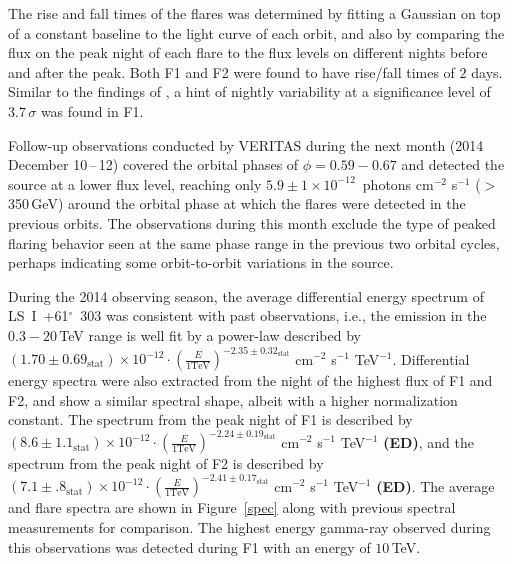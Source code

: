 \documentclass[preprint2]{aastex}
\newcommand{\tapp}{\raisebox{0.5ex}{\texttildelow}}
\newcommand{\pflux}{~photons cm$^{-2}$ s$^{-1}$}
\newcommand{\lsi}{LS~I~+61$^{\circ}$~303}
\newcommand{\gev}{\,GeV}
\newcommand{\tev}{\,TeV}
\begin{document}
The rise and fall times of the flares was determined by fitting a Gaussian on top of a constant baseline to the light curve of each orbit, and also by comparing the flux on the peak night of each flare to the flux levels on different nights before and after the peak. Both F1 and F2 were found to have rise/fall times of \tapp{}$2$ days. Similar to the findings of \cite{2013ApJ...779...88A}, a hint of nightly variability at a significance level of \tapp{}$3.7\,\sigma$ was found in F1.

Follow-up observations conducted by VERITAS during the next month (2014 December 10\,--\,12) covered the orbital phases of $\phi=0.59-0.67$ and detected the source at a lower flux level, reaching only $5.9 \pm 1 \times10^{-12}$\pflux{} ($>$350\gev{}) around the orbital phase at which the flares were detected in the previous orbits. The observations during this month exclude the type of peaked flaring behavior seen at the same phase range in the previous two orbital cycles, perhaps indicating some orbit-to-orbit variations in the source.


During the 2014 observing season, the average differential energy spectrum of \lsi{} was consistent with past observations, i.e., the emission in the $0.3-20$\tev{} range is well fit by a power-law described by $\left( 1.70 \pm 0.69_{\mathrm{stat}} \right) \times 10^{-12} \cdot \left( \frac{E}{\mathrm{1 TeV}} \right)^{-2.35 \pm 0.32_{\mathrm{stat}}}$ cm$^{-2}$ s$^{-1}$ TeV$^{-1}$. Differential energy spectra were also extracted from the night of the highest flux of F1 and F2, and show a similar spectral shape, albeit with a higher normalization constant. The spectrum from the peak night of F1 is described by $\left( 8.6 \pm 1.1_{\mathrm{stat}} \right) \times 10^{-12} \cdot \left( \frac{E}{\mathrm{1 TeV}} \right)^{-2.24 \pm 0.19_{\mathrm{stat}}}$ cm$^{-2}$ s$^{-1}$ TeV$^{-1}$ \textbf{(ED)}, and the spectrum from the peak night of F2 is described by $\left( 7.1 \pm .8_{\mathrm{stat}} \right) \times 10^{-12} \cdot \left( \frac{E}{\mathrm{1 TeV}} \right)^{-2.41 \pm 0.17_{\mathrm{stat}}}$ cm$^{-2}$ s$^{-1}$ TeV$^{-1}$ \textbf{(ED)}. The average and flare spectra are shown in Figure~\ref{spec} along with previous spectral measurements for comparison. The highest energy gamma-ray observed during this observations was detected during F1 with an energy of \tapp{}$10$\tev{}.
\end{document}
